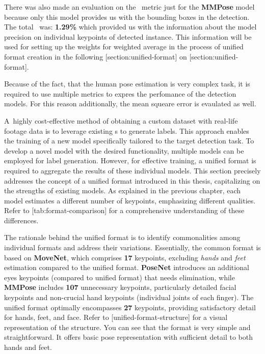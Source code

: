 
There was also made an evaluation on the \APE\ metric just for the {\bf MMPose} model because only this model provides us with the bounding boxes in the detection. The total \APE\ was: {\bf 1.29\%} which provided us with the information about the model precision on individual keypoints of detected instance. This information will be used for setting up the weights for weighted average in the process of unified format creation in the following [section:unified-format] on [section:unified-format].

Because of the fact, that the human pose estimation is very complex task, it is required to use multiple metrics to expres the perfomance of the detection models. For this reason additionally, the mean squeare error is evaulated as well.

A~highly cost-effective method of obtaining a custom dataset with real-life footage data is to leverage existing \NN\-s to generate labels. This approach enables the training of a new model specifically tailored to the target detection task. To develop a novel model with the desired functionality, multiple models can be employed for label generation. However, for effective training, a unified format is required to aggregate the results of these individual models. This section precisely addresses the concept of a unified format introduced in this thesis, capitalizing on the strengths of existing models. As explained in the previous chapter, each model estimates a different number of keypoints, emphasizing different qualities. Refer to [tab:format-comparison] for a comprehensive understanding of these differences.

The rationale behind the unified format is to identify commonalities among individual formats and address their variations. Essentially, the common format is based on {\bf MoveNet}, which comprises {\bf 17} keypoints, excluding {\em hands} and {\em feet} estimation compared to the unified format. {\bf PoseNet} introduces an additional eyes keypoints (compared to unified format) that needs elimination, while {\bf MMPose} includes {\bf 107} unnecessary keypoints, particularly detailed facial keypoints and non-crucial hand keypoints (individual joints of each finger). The unified format optimally encompasses {\bf 27} keypoints, providing satisfactory detail for hands, feet, and face. Refer to [unified-format-structure] for a visual representation of the structure. You can see that the format is very simple and straightforward. It offers basic pose representation with sufficient detail to both hands and feet.


